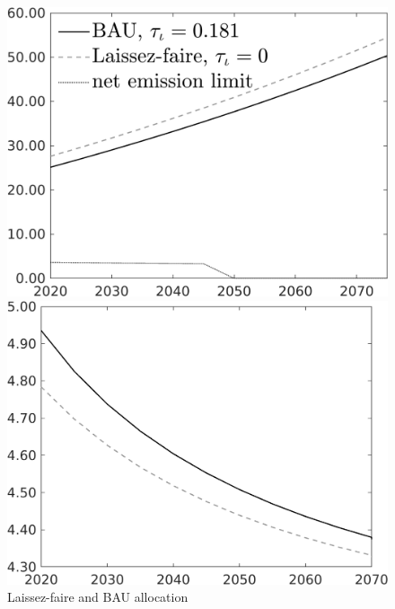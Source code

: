 \begin{figure}[h!!]
	\centering
	\caption{Laissez-faire and BAU allocation }\label{fig:LF_BAU}
	\begin{minipage}[]{0.32\textwidth}
		\includegraphics[width=1\textwidth]{../../codding_model/own_basedOnFried/optimalPol_010922_revision/figures/all_13Sept22/CompTaul_LFBAU_Reg0_Emnet_spillover0_nsk0_xgr0_sep1_countec0_GovRev1_etaa0.79_lgd1.png}
	\end{minipage}	
	\begin{minipage}[]{0.32\textwidth}
		\includegraphics[width=1\textwidth]{../../codding_model/own_basedOnFried/optimalPol_010922_revision/figures/all_13Sept22/CompTaul_LFBAU_Reg0_gAagg_spillover0_nsk0_xgr0_sep1_countec0_GovRev1_etaa0.79_lgd0.png}

\end{minipage}
\end{figure}
